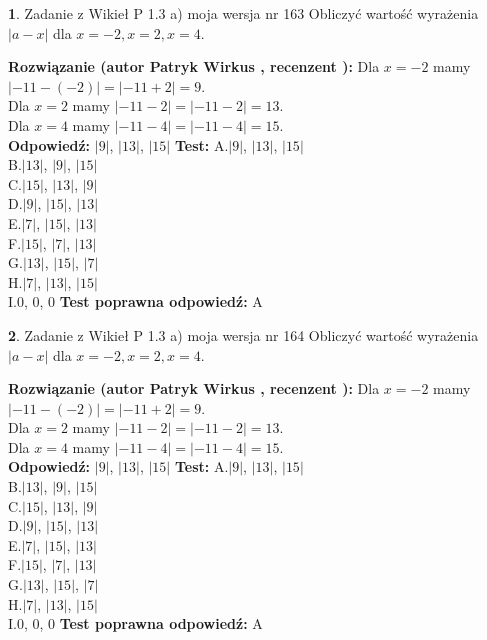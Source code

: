 \documentclass[12pt, a4paper]{article}
\theoremstyle{definition} %
\newtheorem{zad}{}
\newcommand{\zadStart}[1]{\begin{zad}#1\newline}
\newcommand{\zadStop}{\end{zad}}
\newcommand{\rozwStart}[2]{\noindent \textbf{Rozwiązanie (autor #1 , recenzent #2): }\newline}
\newcommand{\rozwStop}{\newline}
\newcommand{\odpStart}{\noindent \textbf{Odpowiedź:}\newline}
\newcommand{\odpStop}{\newline}
\newcommand{\testStart}{\noindent \textbf{Test:}\newline}
\newcommand{\testStop}{\newline}
\newcommand{\kluczStart}{\noindent \textbf{Test poprawna odpowiedź:}\newline}
\newcommand{\kluczStop}{\newline}
\begin{document}
\zadStart{Zadanie z Wikieł P 1.3 a) moja wersja nr 163}
Obliczyć wartość wyrażenia $|a - x|$ dla $x=-2,x=2,x=4$.
\zadStop
\rozwStart{Patryk Wirkus}{}
Dla $x = -2$ mamy $|-11 - (-2)| = |-11 + 2| = 9$.\\
Dla $x = 2$ mamy $|-11 - 2| = |-11 - 2| = 13$.\\
Dla $x = 4$ mamy $|-11 - 4| = |-11 - 4| = 15$.\\
\rozwStop
\odpStart
$|9|$, $|13|$, $|15|$
\odpStop
\testStart
A.$|9|$, $|13|$, $|15|$\\
B.$|13|$, $|9|$, $|15|$\\
C.$|15|$, $|13|$, $|9|$\\
D.$|9|$, $|15|$, $|13|$\\
E.$|7|$, $|15|$, $|13|$\\
F.$|15|$, $|7|$, $|13|$\\
G.$|13|$, $|15|$, $|7|$\\
H.$|7|$, $|13|$, $|15|$\\
I.$0$, $0$, $0$
\testStop
\kluczStart
A
\kluczStop



\zadStart{Zadanie z Wikieł P 1.3 a) moja wersja nr 164}
Obliczyć wartość wyrażenia $|a - x|$ dla $x=-2,x=2,x=4$.
\zadStop
\rozwStart{Patryk Wirkus}{}
Dla $x = -2$ mamy $|-11 - (-2)| = |-11 + 2| = 9$.\\
Dla $x = 2$ mamy $|-11 - 2| = |-11 - 2| = 13$.\\
Dla $x = 4$ mamy $|-11 - 4| = |-11 - 4| = 15$.\\
\rozwStop
\odpStart
$|9|$, $|13|$, $|15|$
\odpStop
\testStart
A.$|9|$, $|13|$, $|15|$\\
B.$|13|$, $|9|$, $|15|$\\
C.$|15|$, $|13|$, $|9|$\\
D.$|9|$, $|15|$, $|13|$\\
E.$|7|$, $|15|$, $|13|$\\
F.$|15|$, $|7|$, $|13|$\\
G.$|13|$, $|15|$, $|7|$\\
H.$|7|$, $|13|$, $|15|$\\
I.$0$, $0$, $0$
\testStop
\kluczStart
A
\kluczStop
\end{document}
